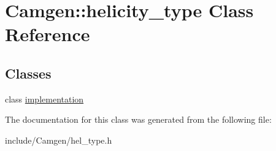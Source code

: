\hypertarget{a00278}{\section{Camgen\-:\-:helicity\-\_\-type Class Reference}
\label{a00278}
}
\subsection*{Classes}
\begin{DoxyCompactItemize}
\item 
class \hyperlink{a00288}{implementation}
\end{DoxyCompactItemize}


The documentation for this class was generated from the following file\-:\begin{DoxyCompactItemize}
\item 
include/\-Camgen/hel\-\_\-type.\-h\end{DoxyCompactItemize}
